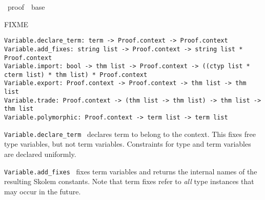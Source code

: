 %
\begin{isabellebody}%
\def\isabellecontext{proof}%
%
\isadelimtheory
\isanewline
\isanewline
\isanewline
%
\endisadelimtheory
%
\isatagtheory
{}\isamarkupfalse%
\ {\isachardoublequoteopen}proof{\isachardoublequoteclose}\ \ base\ %
\endisatagtheory
{\isafoldtheory}%
%
\isadelimtheory
%
\endisadelimtheory
%
\isamarkuptrue%
%
\isamarkuptrue%
%
\begin{isamarkuptext}%
FIXME%
\end{isamarkuptext}%
\isamarkuptrue%
%
\isadelimmlref
%
\endisadelimmlref
%
\isatagmlref
%
\begin{isamarkuptext}%
\begin{mldecls}
  \verb|Variable.declare_term: term -> Proof.context -> Proof.context| \\
  \verb|Variable.add_fixes: string list -> Proof.context -> string list * Proof.context| \\
  \verb|Variable.import: bool -> thm list -> Proof.context -> ((ctyp list * cterm list) * thm list) * Proof.context| \\
  \verb|Variable.export: Proof.context -> Proof.context -> thm list -> thm list| \\
  \verb|Variable.trade: Proof.context -> (thm list -> thm list) -> thm list -> thm list| \\
  \verb|Variable.polymorphic: Proof.context -> term list -> term list| \\
  \end{mldecls}

  \begin{description}

  \item \verb|Variable.declare_term|~ declares term
   to belong to the context.  This fixes free type
  variables, but not term variables.  Constraints for type and term
  variables are declared uniformly.

  \item \verb|Variable.add_fixes|~ fixes term
  variables  and returns the internal names of the
  resulting Skolem constants.  Note that term fixes refer to
  \emph{all} type instances that may occur in the future.


\end{description}
\end{isamarkuptext}
\end{isabellebody}
